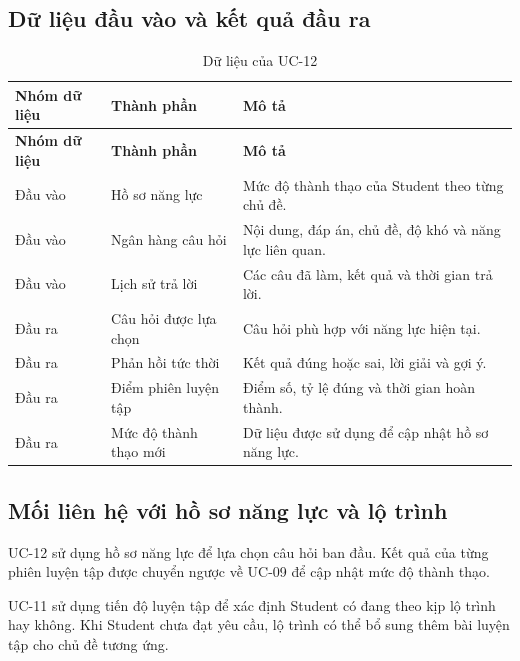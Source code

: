 \subsection{Dữ liệu đầu vào và kết quả đầu ra}

\begin{longtable}{|p{3.5cm}|p{5.3cm}|p{5.6cm}|}
	\caption{Dữ liệu của UC-12}
	\label{tab:uc12-data}\\
	\hline
	\textbf{Nhóm dữ liệu} &
	\textbf{Thành phần} &
	\textbf{Mô tả} \\
	\hline
	\endfirsthead
	
	\hline
	\textbf{Nhóm dữ liệu} &
	\textbf{Thành phần} &
	\textbf{Mô tả} \\
	\hline
	\endhead
	
	Đầu vào &
	Hồ sơ năng lực &
	Mức độ thành thạo của Student theo từng chủ đề. \\
	\hline
	
	Đầu vào &
	Ngân hàng câu hỏi &
	Nội dung, đáp án, chủ đề, độ khó và năng lực liên quan. \\
	\hline
	
	Đầu vào &
	Lịch sử trả lời &
	Các câu đã làm, kết quả và thời gian trả lời. \\
	\hline
	
	Đầu ra &
	Câu hỏi được lựa chọn &
	Câu hỏi phù hợp với năng lực hiện tại. \\
	\hline
	
	Đầu ra &
	Phản hồi tức thời &
	Kết quả đúng hoặc sai, lời giải và gợi ý. \\
	\hline
	
	Đầu ra &
	Điểm phiên luyện tập &
	Điểm số, tỷ lệ đúng và thời gian hoàn thành. \\
	\hline
	
	Đầu ra &
	Mức độ thành thạo mới &
	Dữ liệu được sử dụng để cập nhật hồ sơ năng lực. \\
	\hline
	
\end{longtable}

\subsection{Mối liên hệ với hồ sơ năng lực và lộ trình}

UC-12 sử dụng hồ sơ năng lực để lựa chọn câu hỏi ban đầu. Kết quả của
từng phiên luyện tập được chuyển ngược về UC-09 để cập nhật mức độ thành
thạo.

UC-11 sử dụng tiến độ luyện tập để xác định Student có đang theo kịp lộ
trình hay không. Khi Student chưa đạt yêu cầu, lộ trình có thể bổ sung
thêm bài luyện tập cho chủ đề tương ứng.

